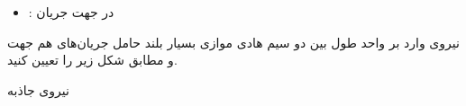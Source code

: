 \begin{ELjoin}

\begin{itemize}
\tightlist
\item
  \ELim{\dif\vect{\ell}}: در جهت جریان
\end{itemize}


\begin{ELexample}{}

نیروی وارد بر واحد طول بین دو سیم هادی موازی بسیار بلند حامل جریان‌های هم جهت  و  مطابق شکل زیر را تعیین کنید.


\begin{ELsolution}


\begin{ELimportant}{نیروی جاذبه}


\end{ELimportant}

\end{ELsolution}

\end{ELexample}

\end{ELjoin}

